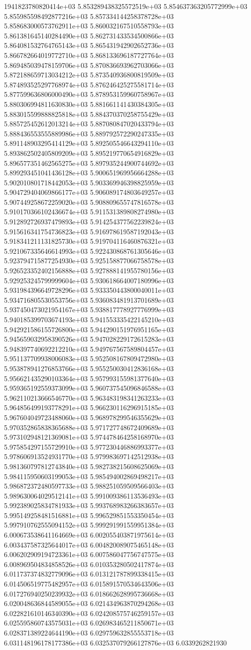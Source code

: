 1941823780820414e+03	5.853289438325572519e+03	5.854637363205772999e+03	5.855985598492877216e+03	5.857334144258378728e+03	5.858683000573762911e+03	5.860032167510558793e+03	5.861381645140284490e+03	5.862731433534500866e+03	5.864081532764765143e+03	5.865431942902652736e+03	5.866782664019772710e+03	5.868133696187727764e+03	5.869485039478159706e+03	5.870836693962703066e+03	5.872188659713034212e+03	5.873540936800819509e+03	5.874893525297768974e+03	5.876246425275581714e+03	5.877599636806000490e+03	5.878953159960758967e+03	5.880306994811630830e+03	5.881661141430384305e+03	5.883015599888825818e+03	5.884370370258755429e+03	5.885725452612013214e+03	5.887080847020433794e+03	5.888436553555889986e+03	5.889792572290247335e+03	5.891148903295414129e+03	5.892505546643294110e+03	5.893862502405809209e+03	5.895219770654916829e+03	5.896577351462565275e+03	5.897935244900744692e+03	5.899293451041436128e+03	5.900651969956664288e+03	5.902010801718442053e+03	5.903369946398825959e+03	5.904729404069866177e+03	5.906089174803649257e+03	5.907449258672259020e+03	5.908809655747816578e+03	5.910170366102436674e+03	5.911531389808274980e+03	5.912892726937479893e+03	5.914254377562239824e+03	5.915616341754736823e+03	5.916978619587192043e+03	5.918341211131825730e+03	5.919704116460876321e+03	5.921067335646614993e+03	5.922430868761305646e+03	5.923794715877254930e+03	5.925158877066758578e+03	5.926523352402156888e+03	5.927888141955780156e+03	5.929253245799999604e+03	5.930618664007180996e+03	5.931984396649728296e+03	5.933350443800040011e+03	5.934716805530553756e+03	5.936083481913701689e+03	5.937450473021954167e+03	5.938817778927776999e+03	5.940185399703674193e+03	5.941553335422145210e+03	5.942921586155726800e+03	5.944290151976951165e+03	5.945659032958390526e+03	5.947028229172615283e+03	5.948397740692212210e+03	5.949767567589804457e+03	5.951137709938006083e+03	5.952508167809472980e+03	5.953878941276853766e+03	5.955250030412836168e+03	5.956621435290103364e+03	5.957993155981377640e+03	5.959365192559373099e+03	5.960737545096846588e+03	5.962110213666546770e+03	5.963483198341263233e+03	5.964856499193778291e+03	5.966230116296915185e+03	5.967604049723488060e+03	5.968978299546355629e+03	5.970352865838365688e+03	5.971727748672409689e+03	5.973102948121369081e+03	5.974478464258168970e+03	5.975854297155729910e+03	5.977230446886993377e+03	5.978606913524931770e+03	5.979983697142512938e+03	5.981360797812743840e+03	5.982738215608625069e+03	5.984115950603199053e+03	5.985494002869498217e+03	5.986872372480597733e+03	5.988251059509566403e+03	5.989630064029512141e+03	5.991009386113536493e+03	5.992389025834781933e+03	5.993768983266383657e+03	5.995149258481516881e+03	5.996529851553350454e+03	5.997910762555094152e+03	5.999291991559951384e+03	6.000673538641164669e+03	6.002055403871975614e+03	6.003437587325644017e+03	6.004820089075465148e+03	6.006202909194723361e+03	6.007586047756747575e+03	6.008969504834858526e+03	6.010353280502417874e+03	6.011737374832779096e+03	6.013121787899338415e+03	6.014506519775482957e+03	6.015891570534643506e+03	6.017276940250239932e+03	6.018662628995736668e+03	6.020048636844589055e+03	6.021434963870294268e+03	6.022821610146340390e+03	6.024208575746259157e+03	6.025595860743575031e+03	6.026983465211850671e+03	6.028371389224644190e+03	6.029759632855553718e+03	6.031148196178177386e+03	6.032537079266127876e+03	6.0339262821930